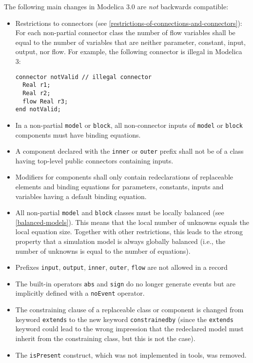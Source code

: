 The following main changes in Modelica 3.0 are \emph{not} backwards compatible:
\begin{itemize}
\item
  Restrictions to connectors (see \cref{restrictions-of-connections-and-connectors}): For each non-partial
  connector class the number of flow variables shall be equal to the
  number of variables that are neither parameter, constant, input,
  output, nor flow. For example, the following connector is illegal in
  Modelica 3:
\begin{lstlisting}[language=modelica]
connector notValid // illegal connector
  Real r1;
  Real r2;
  flow Real r3;
end notValid;
\end{lstlisting}
\item
  In a non-partial \lstinline!model! or \lstinline!block!, all non-connector inputs of \lstinline!model! or \lstinline!block! components must have binding equations.
\item
  A component declared with the \lstinline!inner! or \lstinline!outer! prefix shall not be of a
  class having top-level public connectors containing inputs.
\item
  Modifiers for components shall only contain redeclarations of
  replaceable elements and binding equations for parameters, constants,
  inputs and variables having a default binding equation.
\item
  All non-partial \lstinline!model! and \lstinline!block! classes must be locally balanced (see \cref{balanced-models}).  This means that the local number of unknowns equals the local equation size. Together with other restrictions, this leads to the strong property that a simulation model is always globally balanced (i.e., the number of unknowns is equal to the number of equations).
\item
  Prefixes \lstinline!input!, \lstinline!output!, \lstinline!inner!, \lstinline!outer!, \lstinline!flow! are not allowed in a record
\item
  The built-in operators \lstinline!abs! and \lstinline!sign! do no longer
  generate events but are implicitly defined with a \lstinline!noEvent!
  operator.
\item
  The constraining clause of a replaceable class or component is changed
  from keyword \lstinline!extends! to the new keyword \lstinline!constrainedby! (since the
  \lstinline!extends! keyword could lead to the wrong impression that the redeclared
  model must inherit from the constraining class, but this is not the
  case).
\item
  The \lstinline!isPresent! construct, which was not implemented in tools, was removed.
\end{itemize}

